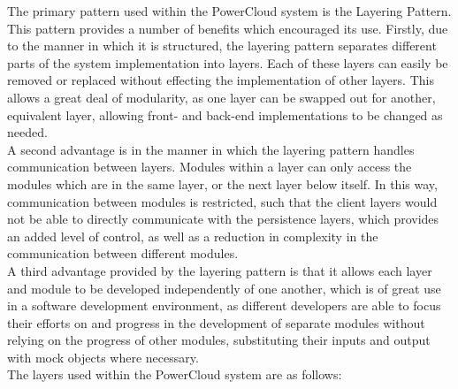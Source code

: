 \documentclass{article}
\begin{document}
	The primary pattern used within the PowerCloud system is the Layering 
	Pattern. This pattern provides a number of benefits which encouraged its 
	use. Firstly, due to the manner in which it is structured, the layering 
	pattern separates different parts of the system implementation into 
	layers. Each of these layers can easily be removed or replaced without 
	effecting the implementation of other layers. This allows a great deal of 
	modularity, as one layer can be swapped out for another, equivalent 
	layer, allowing front- and back-end implementations to be changed as 
	needed.\\
	
	A second advantage is in the manner in which the layering pattern handles 
	communication between layers. Modules within a layer can only access the 
	modules which are in the same layer, or the next layer below itself. In 
	this way, communication between modules is restricted, such that the 
	client layers would not be able to directly communicate with the 
	persistence layers, which provides an added level of control, as well as 
	a reduction in complexity in the communication between different 
	modules.\\
	
	A third advantage provided by the layering pattern is that it allows each 
	layer and module to be developed independently of one another, which is 
	of great use in a software development environment, as different 
	developers are able to focus their efforts on and progress in the 
	development of separate modules without relying on the progress of other 
	modules, substituting their inputs and output with mock objects where 
	necessary.\\
	
	\noindent
	The layers used within the PowerCloud system are as follows:\\
	
\end{document}
